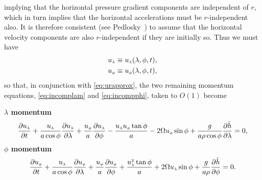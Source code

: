 implying that the horizontal pressure gradient components are independent of $r$, which in turn implies that the horizontal accelerations must be $r$-independent also. It is therefore consistent (see Pedlosky~\cite[page 61]{Pedlosky:GFD}) to assume that the horizontal velocity components are also $r$-independent if they are initially so. Thus we must have
\begin{align}
\ulam &\equiv \ulam(\lambda,\phi,t), \\
\uphi &\equiv \uphi(\lambda,\phi,t),
\end{align}
so that, in conjunction with \eqref{eq:urapprox}, the two remaining momentum equations, \eqref{eq:incomplam} and \eqref{eq:incompphi}, taken to $O(1)$ become

{\bfseries \boldmath$\lambda$ momentum}
\begin{equation}
\dulamd{t} + \frac{\ulam}{a\cos\phi}\dulamd{\lambda}+\frac{\uphi}{a}\dulamd{\phi}-\frac{\ulam\uphi\tan\phi}{a}-2\Omega\uphi\sin\phi+\frac{g}{a\rho\cos\phi}\dhd{\lambda}= 0, \label{eq:incomplam1}
\end{equation}
{\bfseries \boldmath$\phi$ momentum}
\begin{equation}
\duphid{t}+ \frac{\ulam}{a\cos\phi}\duphid{\lambda}+\frac{\uphi}{a}\duphid{\phi}+\frac{\ulams\tan\phi}{a}+2\Omega\ulam\sin\phi+\frac{g}{a\rho}\dhd{\phi}= 0. \label{eq:incompphi1}
\end{equation}

